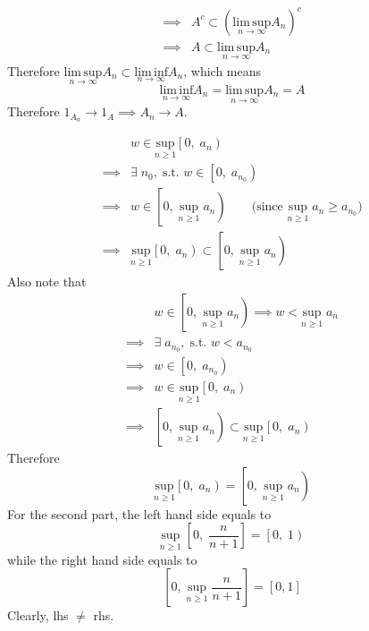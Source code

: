 \begin{list}{1.9.}{}
\[\begin{aligned}
      \implies & A^c \subset \left(\underset{n\to\infty}{\mathrm{lim\,sup}}A_n\right)^c    \\
      \implies & A \subset \underset{n\to\infty}{\mathrm{lim\,sup}}A_n
    \end{aligned}
  \]
  Therefore $\underset{n\to\infty}{\mathrm{lim\,sup}}A_n \subset \underset{n\to\infty}{\mathrm{lim\,inf}}A_n$, which means
  \[
    \underset{n\to\infty}{\mathrm{lim\,inf}}A_n = \underset{n\to\infty}{\mathrm{lim\,sup}}A_n = A
  \]
  Therefore $1_{A_n}\rightarrow 1_A \implies A_n\rightarrow A$.
  
\item
  \[
    \begin{aligned}
      & w \in \underset{n \geq 1}{\mathrm{sup}}\left[0,\; a_n\right)    \\
      \implies & \exists\; n_0,\; \text{s.t. } w \in \left[0,\; a_{n_0}\right)    \\
      \implies & w \in \left[0,\; \underset{n\geq 1}{\mathrm{sup}}\; a_{n}\right) \quad\quad
      \text{(since $\underset{n\geq 1}{\mathrm{sup}}\; a_{n} \geq a_{n_0}$)}    \\
      \implies & \underset{n \geq 1}{\mathrm{sup}}\left[0,\; a_n\right) \subset
      \left[0,\; \underset{n\geq 1}{\mathrm{sup}}\; a_{n}\right)
    \end{aligned}
  \]
  Also note that
  \[
    \begin{aligned}
      & w \in \left[0,\; \underset{n\geq 1}{\mathrm{sup}}\; a_{n}\right)
      \implies w < \underset{n\geq 1}{\mathrm{sup}}\; a_{n}\\
      \implies & \exists\; a_{n_0},\; \text{s.t. } w < a_{n_0}    \\
      \implies & w \in \left[0,\; a_{n_0}\right)    \\
      \implies & w \in \underset{n \geq 1}{\mathrm{sup}}\left[0,\; a_n\right)    \\
      \implies & \left[0,\; \underset{n\geq 1}{\mathrm{sup}}\; a_{n}\right) \subset
      \underset{n \geq 1}{\mathrm{sup}}\left[0,\; a_n\right)
    \end{aligned}
  \]
  Therefore
  \[
    \underset{n \geq 1}{\mathrm{sup}}\left[0,\; a_n\right)
    = \left[0,\; \underset{n\geq 1}{\mathrm{sup}}\; a_{n}\right)
  \]
  For the second part, the left hand side equals to
  \[
    \underset{n\geq 1}{\mathrm{sup}}\; \left[0,\; \frac{n}{n+1}\right] = \left[0,\; 1\right)
  \]
  while the right hand side equals to
  \[
    \left[0,\; \underset{n\geq 1}{\mathrm{sup}}\; \frac{n}{n+1}\right] = \left[0, 1\right]
  \]
  Clearly, lhs $\neq$ rhs.
  

\end{list}
